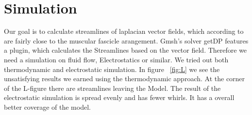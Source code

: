 \documentclass[preprint,journal]{vgtc}       %
\begin{document}
\section{Simulation}
Our goal is to calculate streamlines of laplacian vector fields, which according to~\cite{Choi2013} are fairly close to the muscular fascicle arangement. Gmsh's solver getDP features a plugin, which calculates the Streamlines based on the vector field. Therefore we need a simulation on fluid flow, Electrostatics or similar. We tried out both thermodynamic and electrostatic simulation. In figure ~\ref{fig:L} we see the unsatisfying results we earned using the thermodynamic approach. At the corner of the L-figure there are streamlines leaving the Model. The result of the electrostatic simulation is spread evenly and has fewer whirls. It has a overall better coverage of the model.
\end{document}
